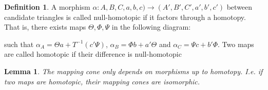 \documentclass[12pt]{article}
\newtheorem{lemma}[theorem]{Lemma}
\theoremstyle{definition}
\newtheorem{definition}{Definition}[section]
\theoremstyle{remark}
\begin{document}
            \begin{definition}
                A morphism $\alpha : A,B,C,a,b,c) \rightarrow (A',B',C',a',b',c')$ between candidate triangles is called null-homotopic if it factors through a homotopy. That is, there exists maps $\Theta, \Phi, \Psi$ in the following diagram:
                \begin{center}
                \end{center}
                such that $\alpha_A  = \Theta a + T^{-1}(c'\Psi)$, $\alpha_B = \Phi b + a'\Theta$ and $\alpha_C = \Psi c + b'\Phi$.
                Two maps are called homotopic if their difference is null-homotopic
            \end{definition}

            \begin{lemma}
                The mapping cone only depends on morphisms up to homotopy. I.e. if two maps are homotopic, their mapping cones are isomorphic.
            \end{lemma}
\end{document}
